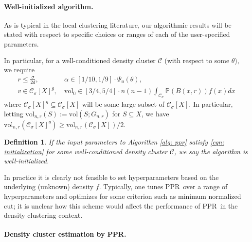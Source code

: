 \documentclass{article}
\newcommand{\vol}{\mathrm{vol}}
\newcommand{\1}{\mathbf{1}}
\newcommand{\Psibf}{\Psi_{u}}
\newcommand{\Xbf}{X}             %
\newcommand{\Pbb}{\mathbb{P}}
\newcommand{\Cset}{\mathcal{C}}
\newcommand{\Csig}{\Cset_{\sigma}}
\newcommand{\ppr}{{\sc PPR}}
\newcommand{\pprspace}{{\sc PPR~}}
\theoremstyle{aldenthm}
\newtheorem{definition}{Definition}
\theoremstyle{aldenrmrk}
\begin{document}
\paragraph{Well-initialized algorithm.}

As is typical in the local clustering literature, our algorithmic results will be stated with respect to specific choices or ranges of each of the user-specified parameters.

In particular, for a well-conditioned density cluster $\Cset$ (with respect to some $\theta$), we require
\begin{align}
\label{eqn: initialization}
r \leq \frac{\sigma}{2d}, & ~\alpha \in [1/10, 1/9] \cdot \Psibf(\theta) \nonumber,  \\
v \in \Csig[\Xbf]^g, & ~\vol_0 \in [3/4,5/4] \cdot n(n-1) \int_{\Csig} \Pbb(B(x,r)) f(x) dx
\end{align}
where $\Csig[\Xbf]^g \subseteq \Csig[\Xbf]$ will be some large subset of $\Csig[\Xbf]$. In particular, letting $\vol_{n,r}(S) := \vol(S; G_{n,r})$ for $S \subseteq \Xbf$, we have $\vol_{n,r}(\Csig[\Xbf]^g) \geq \vol_{n,r}(\Csig[\Xbf])/2$.

\begin{definition}
	If the input parameters to Algorithm \ref{alg: ppr} satisfy \eqref{eqn: initialization} for some well-conditioned density cluster $\Cset$, we say the algorithm is \emph{well-initialized}.
\end{definition}

In practice it is clearly not feasible to set hyperparameters based on the underlying (unknown) density $f$. Typically, one tunes \pprspace over a range of hyperparameters and optimizes for some criterion such as minimum normalized cut; it is unclear how this scheme would affect the performance of \pprspace in the density clustering context.

\paragraph{Density cluster estimation by \ppr.}
\end{document}
